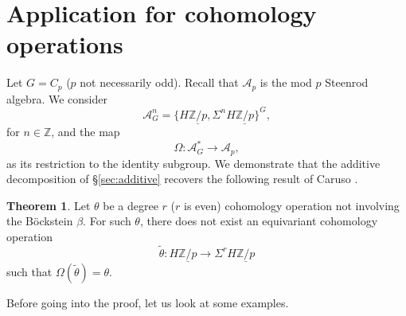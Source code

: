 \documentclass[a4paper,leqno,11pt]{amsart}
\theoremstyle{plain}
\theoremstyle{definition}
\newtheorem{thm}[theorem]{Theorem}
\theoremstyle{remark}
\theoremstyle{definition}
\newcommand{\Z}{{\mathbb{Z}}}
\def\Z{\mathbb{Z}}
\numberwithin{equation}{section}
\newcommand{\Zp}{\underline{{\mathbb Z}/p}}
\begin{document}
	\section{Application for cohomology operations} \label{sec cohop}
	Let $ G=C_p $ ($ p $ not necessarily odd).  Recall that $ \mathcal{A}_p $ is the mod $ p $ Steenrod algebra. We consider 
	$$
	\mathcal{A}_{G}^n= \{H\Zp, \Sigma^n H\Zp\}^G, 
	$$
	for $ n\in \Z $, and the map
	$$ \Omega:  \mathcal{A}_{G}^*\to \mathcal{ A}_p, $$
	as its restriction to the identity subgroup.
	We demonstrate that the additive decomposition of \S \ref{sec:additive} recovers the following result of Caruso \cite{Caruso}. 
	\begin{thm}\label{thm:coh op}
		Let $ \theta $ be a  degree $ r $ ($ r $ is even) cohomology operation  not involving the B\"{o}ckstein $ \beta $. For such $ \theta $, there does not exist an equivariant cohomology operation 
		\[
		\tilde{\theta}: H\Zp\to \Sigma^{r}H\Zp
		\] 
		such that $ \Omega(\tilde{\theta})=\theta $.
	\end{thm}
	Before going into the proof, let us look at  some examples. 
\end{document}
